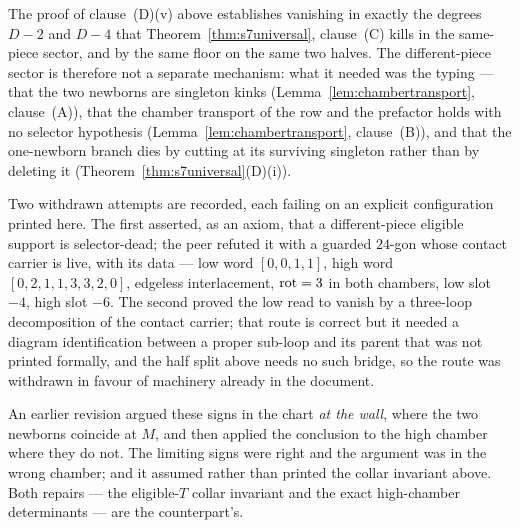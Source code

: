 \begin{remark}
\label{rem:diffcensus}
The proof of clause~(D)(v) above establishes vanishing in exactly the degrees $D-2$ and $D-4$
that Theorem~\ref{thm:s7universal}, clause~(C) kills in the same-piece sector, and by
the same floor on the same two halves. The different-piece sector is therefore
not a separate mechanism: what it needed was the typing --- that the two
newborns are singleton kinks (Lemma~\ref{lem:chambertransport}, clause~(A)), that the
chamber transport of the row and the prefactor holds with no selector
hypothesis (Lemma~\ref{lem:chambertransport}, clause~(B)), and that the one-newborn branch
dies by cutting at its surviving singleton rather than by deleting it
(Theorem~\ref{thm:s7universal}(D)(i)).

Two withdrawn attempts are recorded, each failing on an explicit
configuration printed here. The first asserted, as an axiom, that a
different-piece eligible support is selector-dead;
the peer refuted it with a guarded $24$-gon whose contact carrier is live,
with its data --- low word $[0,0,1,1]$, high word
$[0,2,1,1,3,3,2,0]$, edgeless interlacement, $\operatorname{rot}=3$ in both chambers, low slot
$-4$, high slot $-6$. The second proved the low read to vanish by
a three-loop decomposition of the contact carrier; that route is correct but it
needed a diagram identification between a proper sub-loop and its parent that
was not printed formally, and the half split above needs no such bridge, so the
route was withdrawn in favour of machinery already in the document.
\end{remark}

\begin{remark}\label{rem:d61bridge}
An earlier revision argued these signs in the chart \emph{at the wall}, where
the two newborns coincide at $M$, and then applied the conclusion to the high
chamber where they do not. The limiting signs were right and the argument was
in the wrong chamber; and it assumed rather than printed the collar invariant
above. Both repairs --- the eligible-$T$ collar invariant and the exact
high-chamber determinants --- are the counterpart's.
\end{remark}

